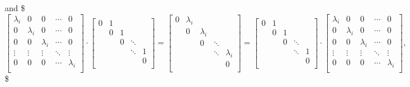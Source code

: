 \documentclass[letterpaper,10pt,english]{jupyterBook}
\begin{document}
\sphinxAtStartPar
and
\$\(
\left[ {\begin{array}{ccccc}
    \lambda_i & 0 & 0 & \dotsm & 0\\
    0 & \lambda_i & 0 & \dotsm & 0\\
    0 & 0 & \lambda_i & \dotsm & 0\\
    \vdots & \vdots & \vdots & \ddots & \vdots\\
    0 & 0 & 0 & \dotsm & \lambda_i\\
\end{array} } \right] \cdot \left[ {\begin{array}{ccccc}
    0 & 1 &  &  & \\
     & 0 & 1 &  &\\
     &  & 0 & \ddots &\\
     &  &  & \ddots & 1\\
     &  &  &  & 0\\
\end{array} } \right] = \left[ {\begin{array}{ccccc}
    0 & \lambda_i &  &  & \\
     & 0 & \lambda_i &  &\\
     &  & 0 & \ddots &\\
     &  &  & \ddots & \lambda_i\\
     &  &  &  & 0\\
\end{array} } \right] = \left[ {\begin{array}{ccccc}
    0 & 1 &  &  & \\
     & 0 & 1 &  &\\
     &  & 0 & \ddots &\\
     &  &  & \ddots & 1\\
     &  &  &  & 0\\
\end{array} } \right] \cdot \left[ {\begin{array}{ccccc}
    \lambda_i & 0 & 0 & \dotsm & 0\\
    0 & \lambda_i & 0 & \dotsm & 0\\
    0 & 0 & \lambda_i & \dotsm & 0\\
    \vdots & \vdots & \vdots & \ddots & \vdots\\
    0 & 0 & 0 & \dotsm & \lambda_i\\
\end{array} } \right],
\)\$
\end{document}
